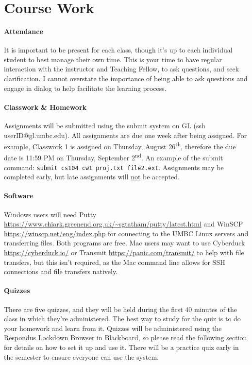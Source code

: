 \documentclass[letter,11pt]{article}
\begin{document}
\section*{Course Work}
\paragraph{Attendance}It is important to be present for each class, though it's up to each individual student to best manage their own time. This is your time to have regular interaction with the instructor and Teaching Fellow, to ask questions, and seek clarification. I cannot overstate the importance of being able to ask questions and engage in dialog to help facilitate the learning process.

\paragraph{Classwork \& Homework}Assignments will be submitted using the submit system on GL (ssh userID@gl.umbc.edu). All assignments are due one week after being assigned. For example, Classwork 1 is assigned on Thursday, August 26\textsuperscript{th}, therefore the due date is 11:59 PM on Thursday, September 2\textsuperscript{nd}. An example of the submit command: \texttt{submit cs104 cw1 proj.txt file2.ext}. Assignments may be completed early, but late assignments will \underline{not} be accepted.

\paragraph{Software} Windows users will need Putty \url{https://www.chiark.greenend.org.uk/~sgtatham/putty/latest.html} and WinSCP \url{https://winscp.net/eng/index.php} for connecting to the UMBC Linux servers and transferring files. Both programs are free. Mac users may want to use Cyberduck \url{https://cyberduck.io/} or Transmit \url{https://panic.com/transmit/} to help with file transfers, but this isn't required, as the Mac command line allows for SSH connections and file transfers natively.

\paragraph{Quizzes}There are five quizzes, and they will be held during the first 40 minutes of the class in which they're administered. The best way to study for the quiz is to do your homework and learn from it. Quizzes will be administered using the Respondus Lockdown Browser in Blackboard, so please read the following section for details on how to set it up and use it. There will be a practice quiz early in the semester to ensure everyone can use the system.
\end{document}
